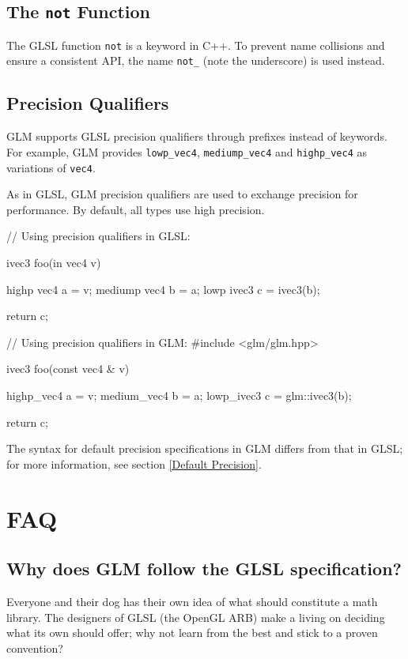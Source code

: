 \documentclass{scrartcl}
\numberwithin{figure}{subsection}
\begin{document}
\subsection{The \texttt{not} Function}

The GLSL function \verb|not| is a keyword in C++. To prevent name collisions and ensure a consistent API, the name \verb|not_| (note the underscore) is used instead.

\subsection{Precision Qualifiers}

GLM supports GLSL precision qualifiers through prefixes instead of keywords. For example, GLM provides \verb|lowp_vec4|, \verb|mediump_vec4| and \verb|highp_vec4| as variations of \verb|vec4|.

As in GLSL, GLM precision qualifiers are used to exchange precision for performance.  By default, all types use high precision.

\begin{glslcode}
// Using precision qualifiers in GLSL:

ivec3 foo(in vec4 v)
{
  highp vec4 a = v;
  mediump vec4 b = a;
  lowp ivec3 c = ivec3(b);

  return c;
}
\end{glslcode}

\begin{cppcode}
// Using precision qualifiers in GLM:
#include <glm/glm.hpp>

ivec3 foo(const vec4 & v)
{
  highp_vec4 a = v;
  medium_vec4 b = a;
  lowp_ivec3 c = glm::ivec3(b);

  return c;
}
\end{cppcode}

The syntax for default precision specifications in GLM differs from that in GLSL; for more information, see section \ref{Default Precision}.

\newpage{}

\section{FAQ}

\subsection{Why does GLM follow the GLSL specification?}

Everyone and their dog has their own idea of what should constitute a math library.  The designers of GLSL (the OpenGL ARB) make a living on deciding what its own should offer; why not learn from the best and stick to a proven convention?
\end{document}
